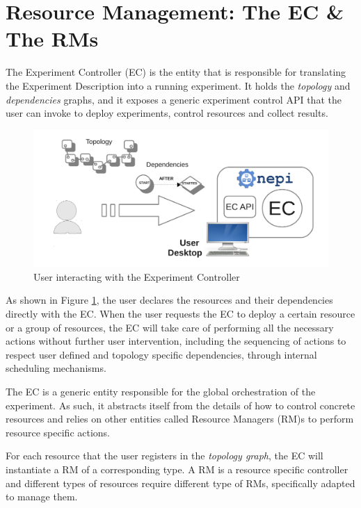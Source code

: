 \section{Resource Management: The EC \& The RMs}

The Experiment Controller (EC) is the entity that is responsible for 
translating the Experiment Description into a running experiment.
It holds the \emph{topology} and \emph{dependencies} graphs, and it 
exposes a generic experiment control API that the user can 
invoke to deploy experiments, control resources and collect results. 

\begin{figure}[h]
  \centering
  \includegraphics[width=\textwidth]{intro_ec}
  \caption{User interacting with the Experiment Controller}
  \label{fig:intro_ec}
\end{figure}

As shown in Figure \ref{fig:intro_ec}, the user declares the resources and
their dependencies directly with the EC. 
When the user requests the EC to deploy a certain resource or a
group of resources, the EC will take care of performing all the necessary 
actions without further user intervention, including the sequencing of 
actions to respect user defined and topology specific dependencies, 
through internal scheduling mechanisms. 

The EC is a generic entity responsible for the global orchestration of
the experiment. As such, it abstracts itself from the details of how to
control concrete resources and relies on other entities called Resource Managers 
(RM)s to perform resource specific actions. 

For each resource that the user registers in the \emph{topology graph}, the EC
will instantiate a RM of a corresponding type. A RM is a resource specific
controller and different types of resources require different type of
RMs, specifically adapted to manage them.

